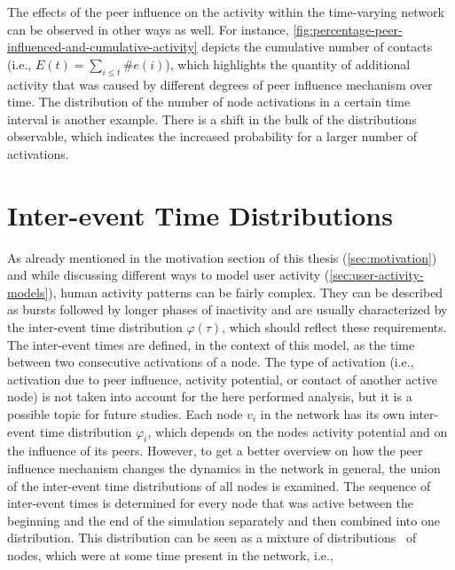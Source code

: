 The effects of the peer influence on the activity within the time-varying network can be observed in other ways as well.
For instance, \cref{fig:percentage-peer-influenced-and-cumulative-activity} depicts the cumulative number of contacts (i.e., \( E(t) = \sum_{i \leq t} \#e(i) \)), which highlights the quantity of additional activity that was caused by different degrees of peer influence mechanism over time.
The distribution of the number of node activations in a certain time interval is another example.
There is a shift in the bulk of the distributions observable, which indicates the increased probability for a larger number of activations.




\section{Inter-event Time Distributions}
\label{sec:inter-event-time-dists}

As already mentioned in the motivation section of this thesis (\cref{sec:motivation}) and while discussing different ways to model user activity (\cref{sec:user-activity-models}), human activity patterns can be fairly complex.
They can be described as bursts followed by longer phases of inactivity and are usually characterized by the inter-event time distribution \( \varphi(\tau) \), which should reflect these requirements.
The inter-event times are defined, in the context of this model, as the time between two consecutive activations of a node.
The type of activation (i.e., activation due to peer influence, activity potential, or contact of another active node) is not taken into account for the here performed analysis, but it is a possible topic for future studies.
Each node \( v_{i} \) in the network has its own inter-event time distribution \( \varphi_{i} \), which depends on the nodes activity potential and on the influence of its peers.
However, to get a better overview on how the peer influence mechanism changes the dynamics in the network in general, the union of the inter-event time distributions of all nodes is examined.
The sequence of inter-event times is determined for every node that was active between the beginning and the end of the simulation separately and then combined into one distribution.
This distribution can be seen as a mixture of distributions~\cite{Seidel2011} of nodes, which were at some time present in the network, i.e.,

